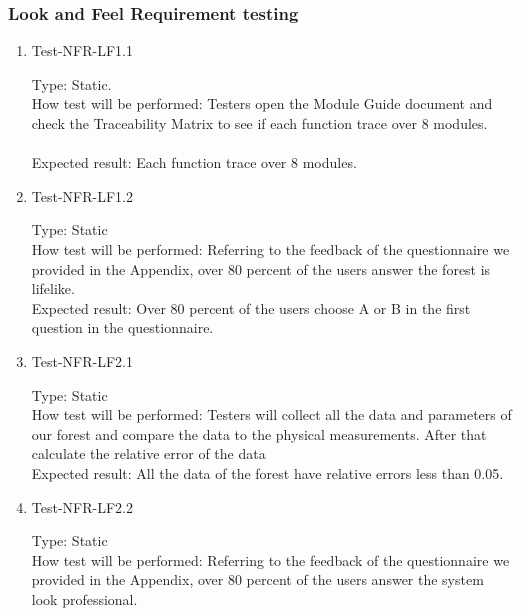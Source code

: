 \documentclass[12pt, titlepage]{article}
\begin{document}
\subsubsection{Look and Feel Requirement testing}

\begin{enumerate}

\item{Test-NFR-LF1.1\\}

Type: Static.\\
How test will be performed: Testers open the Module Guide document and check the Traceability Matrix to see if each function trace over 8 modules.\\\\
Expected result: Each function trace over 8 modules.					
\item{Test-NFR-LF1.2\\}

Type: Static\\

How test will be performed: Referring to the feedback of the questionnaire we provided in the Appendix, over 80 percent of the users answer the forest is lifelike.\\

Expected result: Over 80 percent of the users choose A or B in the first question in the questionnaire.

\item{Test-NFR-LF2.1\\}

Type: Static\\

How test will be performed: Testers will collect all the data and parameters of our forest and compare the data to the physical measurements. After that calculate the relative error of the data\\

Expected result: All the data of the forest have relative errors less than 0.05.

\item{Test-NFR-LF2.2\\}

Type: Static\\

How test will be performed: Referring to the feedback of the questionnaire we provided in the Appendix, over 80 percent of the users answer the system look professional.\\


\end{enumerate}
\end{document}

